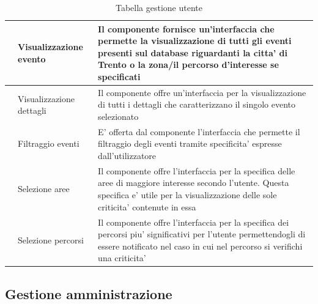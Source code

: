\documentclass{article}
\begin{document}
\begin{table}[htbp]
\begin{tabularx}{\textwidth}{| l | l | X |}
        \hline
         & Visualizzazione evento & Il componente fornisce un'interfaccia che permette la visualizzazione di tutti gli eventi presenti sul database riguardanti la citta' di Trento o la zona/il percorso d'interesse se specificati \\
        \hline
         & Visualizzazione dettagli & Il componente offre un'interfaccia per la visualizzazione di tutti i dettagli che caratterizzano il singolo evento selezionato \\
        \hline
         & Filtraggio eventi & E' offerta dal componente l'interfaccia che permette il filtraggio degli eventi tramite specificita' espresse dall'utilizzatore \\
        \hline
         & Selezione aree & Il componente offre l'interfaccia per la specifica delle aree di maggiore interesse secondo l'utente. Questa specifica e' utile per la visualizzazione delle sole criticita' contenute in essa \\
        \hline
         & Selezione percorsi & Il componente offre l'interfaccia per la specifica dei percorsi piu' significativi per l'utente permettendogli di essere notificato nel caso in cui nel percorso si verifichi una criticita' \\
        \hline
    \end{tabularx}
    \caption{Tabella gestione utente}
\end{table}

\clearpage

\subsection{Gestione amministrazione}
\end{document}
